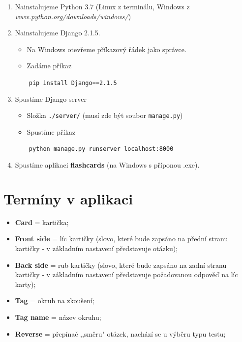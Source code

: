 \documentclass[11pt]{article}
\providecommand{\tightlist}{\setlength{\itemsep}{1pt}\setlength{\parskip}{1pt}}
\let\oldtexttt\texttt
\renewcommand{\texttt}[1]{\oldtexttt{\textcolor{codehighlight}{#1}}}
\begin{document}
\begin{enumerate}
\def\labelenumi{\arabic{enumi}.}
\item
  Nainstalujeme Python 3.7 (Linux z terminálu, Windows z
  \emph{www.python.org/downloads/windows/})
\item
  Nainstalujeme Django 2.1.5.

  \begin{itemize}
  \tightlist
  \item
    Na Windows otevřeme příkazový řádek jako správce.
  \item
    Zadáme příkaz
  \end{itemize}

  ~~~~\texttt{pip\ install\ Django==2.1.5}
\item
  Spustíme Django server

  \begin{itemize}
  \tightlist
  \item
    Složka \texttt{./server/} (musí zde být soubor \texttt{manage.py})
  \item
    Spustíme příkaz
  \end{itemize}

  ~~~~\texttt{python\ manage.py\ runserver\ localhost:8000}
\item
  Spustíme aplikaci \textbf{flashcards} (na Windows s příponou .exe).
\end{enumerate}

\hypertarget{termuxedny-v-aplikaci}{%
\section{Termíny v aplikaci}\label{termuxedny-v-aplikaci}}

\begin{itemize}
\tightlist
\item
  \textbf{Card} = kartička;
\item
  \textbf{Front side} = líc kartičky (slovo, které bude zapsáno na
  přední stranu kartičky - v základním nastavení představuje otázku);
\item
  \textbf{Back side} = rub kartičky (slovo, které bude zapsáno na zadní
  stranu kartičky - v základním nastavení představuje požadovanou
  odpověď na líc karty);
\item
  \textbf{Tag} = okruh na zkoušení;
\item
  \textbf{Tag name} = název okruhu;
\item
  \textbf{Reverse} = přepínač ,,směru" otázek, nachází se u výběru typu
  testu;
\end{itemize}
\end{document}
